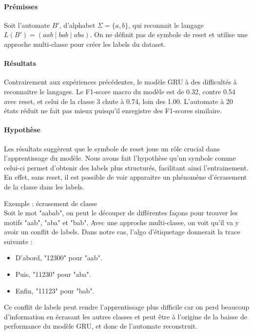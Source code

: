 \documentclass{article}
\begin{document}
\paragraph{Prémisses}  Soit l'automate $B'$, d'alphabet $\Sigma = \{a,b\}$, qui reconnait le langage 
$L(B') = (aab \mid bab \mid aba)$. On ne définit pas de symbole de reset et utilise une 
approche multi-classe pour créer les labels du dataset.

\paragraph{Résultats} Contrairement aux expériences précédentes, le modèle GRU à des difficultés à reconnaitre le langages.
Le F1-score macro du modèle est de 0.32, contre 0.54 avec reset, et celui de la classe 3 chute à 0.74, loin des 1.00. L'automate à 20 états réduit ne fait pas mieux puisqu'il enregistre des F1-scores similaire.

\paragraph{Hypothèse} Les résultats suggèrent que le symbole de reset joue un rôle crucial dans l'apprentissage du modèle.
Nous avons fait l'hypothèse qu'un symbole comme celui-ci permet d'obtenir des labels plus structurés, facilitant ainsi
l'entrainement. En effet, sans reset, il est possible de voir apparaitre un phénomène d'écrasement de la classe dans les labels.

\begin{example}{Exemple : écrasement de classe}
\\ Soit le mot "aabab", on peut le découper de différentes façons pour trouver les motifs "aab", "aba" et "bab".
Avec une approche multi-classe, on voit qu'il va y avoir un conflit de labels. Dans notre cas, l'algo d'étiquetage
donnerait la trace suivante :
\begin{itemize}
    \item D'abord, "12300" pour "aab".
    \item Puis, "11230" pour "aba".
    \item Enfin, "11123" pour "bab".
\end{itemize}
\end{example}

Ce conflit de labels peut rendre l'apprentissage plus difficile car on perd beaucoup d'information en écrasant 
les autres classes et peut être à l'origine de la baisse de performance du modèle GRU, et donc de l'automate reconstruit.
\end{document}
